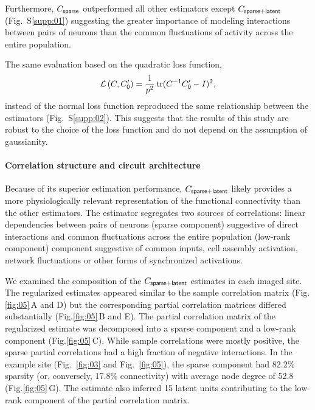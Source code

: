 \documentclass[10pt]{article}
\DeclareMathOperator{\Tr}{tr}
\newcommand{\figref}[2]{Fig.\;\ref{fig:#1}\,#2}
\newcommand{\loss}[1]{\mathcal L\left(#1\right)}
\begin{document}
Furthermore, $C_{\sf sparse}$ outperformed all other estimators except $C_{\sf sparse+latent}$ (Fig.~S\ref{supp:01}) suggesting the greater importance of modeling interactions between pairs of neurons than the common fluctuations of activity across the entire population.

The same evaluation based on the quadratic loss function,
\begin{equation}\label{eq:quadratic}
\loss{C,C_{\sf 0}^\prime}=\frac 1 {p^2}\Tr(C^{-1}C_{\sf 0}^\prime-I)^2,
\end{equation}
instead of the normal loss function reproduced the same relationship between the estimators (Fig.~S\ref{supp:02}). This suggests that the results of this study are robust to the choice of the loss function and do not depend on the assumption of gaussianity. 

\paragraph{Correlation structure and circuit architecture}
Because of its superior estimation performance, $C_{\sf sparse+latent}$ likely provides a more physiologically relevant representation of the functional connectivity than the other estimators.  The estimator segregates two sources of correlations: linear dependencies between pairs of neurons (sparse component) suggestive of direct interactions and common fluctuations across the entire population (low-rank component) component suggestive of common inputs, cell assembly activation, network fluctuations or other forms of synchronized activations. 

We examined the composition of the $C_{\sf sparse+latent}$ estimates in each imaged site. The regularized estimates appeared similar to the sample correlation matrix (\figref{05}{A and D}) but the corresponding partial correlation matrices differed substantially (\figref{05}{B and E}). The partial correlation matrix of the regularized estimate was decomposed into a sparse component and a low-rank component (\figref{05}{C}).  While sample correlations were mostly positive, the sparse partial correlations had a high fraction of negative interactions.  In the example site (Fig.~\ref{fig:03} and Fig.~\ref{fig:05}),  the sparse component had 82.2\% sparsity (or, conversely, 17.8\% connectivity) with average node degree of 52.8 (\figref{05}{G}).  The estimate also inferred 15 latent units contributing to the low-rank component of the partial correlation matrix.
\end{document}
